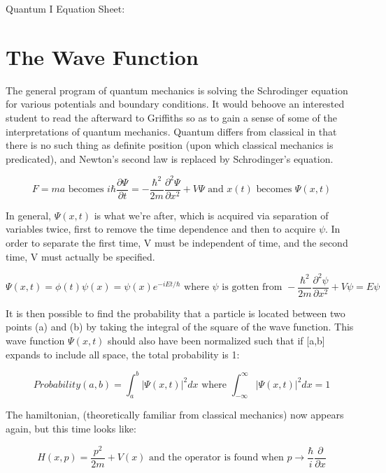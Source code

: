 \documentclass[aps,pre,nofootinbib]{revtex4}
\begin{document}
Quantum I Equation Sheet:

\section{The Wave Function}

The general program of quantum mechanics is solving the Schrodinger equation for various potentials and boundary conditions.  It would behoove an interested student to read the afterward to Griffiths so as to gain a sense of some of the interpretations of quantum mechanics. Quantum differs from classical in that there is no such thing as definite position (upon which classical mechanics is predicated), and Newton's second law is replaced by Schrodinger's equation.  

\begin{equation}
F=ma \textrm{  becomes } i\hbar \frac{\partial \Psi}{\partial t} = -\frac{\hbar^2}{2m}\frac{\partial^2 \Psi}{\partial x^2} + V \Psi \textrm{  and  } x(t) \textrm{  becomes  } \Psi(x,t)
\end{equation}

In general, $\Psi(x,t)$ is what we're after, which is acquired via separation of variables twice, first to remove the time dependence and then to acquire $\psi$.  In order to separate the first time, V must be independent of time, and the second time, V must actually be specified.  

\begin{equation}
\Psi(x,t) = \phi(t) \psi(x) = \psi(x) e^{-iEt/\hbar} \textrm{  where $\psi$ is gotten from  } -\frac{\hbar^2}{2m}\frac{\partial^2 \psi}{\partial x^2} + V \psi = E\psi
\end{equation}

It is then possible to find the probability that a particle is located between two points (a) and (b) by taking the integral of the square of the wave function.  This wave function $\Psi(x,t)$ should also have been normalized such that if [a,b] expands to include all space, the total probability is 1:

\begin{equation}
Probability(a,b) = \int_a^b|\Psi(x,t)|^2 dx \textrm{   where   } \int_{-\infty}^{\infty}|\Psi(x,t)|^2 dx = 1
\end{equation}

The hamiltonian, (theoretically familiar from classical mechanics) now appears again, but this time looks like: 

\begin{equation}
\label{hamiltonian}
H(x,p) = \frac{p^2}{2m} + V(x) \textrm{  and the operator is found when  } p \rightarrow \frac{\hbar}{i}\frac{\partial}{\partial x}
\end{equation}
\end{document}
